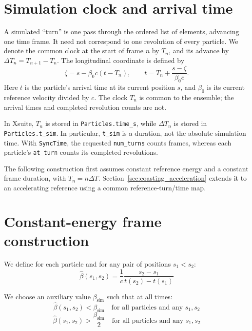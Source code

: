 \section{Simulation clock and arrival time}

A simulated ``turn'' is one pass through the ordered list of elements, advancing
one time frame. It need not correspond to one revolution of every particle.
We denote the common clock at the start of frame $n$ by $T_n$, and its advance
by $\Delta T_n = T_{n+1}-T_n$. The longitudinal coordinate is defined by
\begin{equation}
\boxed{\zeta = s - \beta_0 c(t-T_n),
\qquad t = T_n + \frac{s-\zeta}{\beta_0 c}.}
\label{eq:coasting_arrival_time}
\end{equation}
Here $t$ is the particle's arrival time at its current position $s$, and $\beta_0$
is its current reference velocity divided by $c$. The clock $T_n$ is common
to the ensemble; the arrival times and completed revolution counts are not.

In Xsuite, $T_n$ is stored in \texttt{Particles.time\_s}, while
$\Delta T_n$ is stored in \texttt{Particles.t\_sim}. In particular,
\texttt{t\_sim} is a duration, not the absolute simulation time.
With \texttt{SyncTime}, the requested \texttt{num\_turns} counts frames, whereas
each particle's \texttt{at\_turn} counts its completed revolutions.

The following construction first assumes constant reference energy and a
constant frame duration, with $T_n=n\Delta T$. Section~\ref{sec:coasting_acceleration}
extends it to an accelerating reference using a common reference-turn/time map.

\section{Constant-energy frame construction}

We define for each particle and for any pair of positions $s_1 < s_2$:
\begin{equation}
\hat{\beta}(s_1, s_2) = \frac{1}{c}\frac{s_2-s_1}{t(s_2) - t(s_1)}
\end{equation}

We choose an auxiliary value $\beta_\text{sim}$ such that at all times:
\begin{equation}
\hat{\beta}(s_1, s_2) < \beta_\text{sim} \quad \text{for all particles and any } s_1, s_2
\label{eq:betasim1}
\end{equation}
\begin{equation}
\hat{\beta}(s_1, s_2) > \frac{\beta_\text{sim}}{2}\quad \text{for all particles and any } s_1, s_2
\label{eq:betasim2}
\end{equation}

